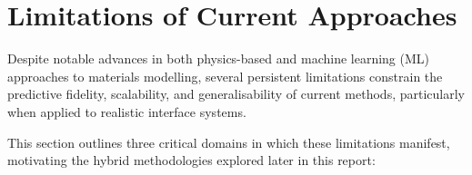 \section{Limitations of Current Approaches}


Despite notable advances in both physics-based and machine learning (ML) approaches to materials modelling, several
persistent limitations constrain the predictive fidelity, scalability, and generalisability of current methods,
particularly when applied to realistic interface systems.

This section outlines three critical domains in which these limitations manifest, motivating the hybrid methodologies
explored later in this report:


